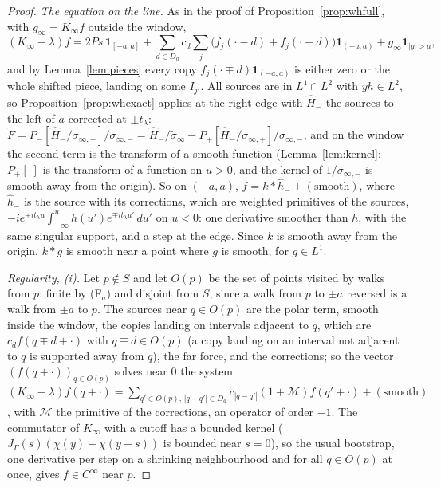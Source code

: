 \documentclass[11pt]{article}
\theoremstyle{definition}
\theoremstyle{remark}
\begin{document}
\begin{proof}
\emph{The equation on the line.} As in the proof of Proposition~\ref{prop:whfull}, with $g_\infty=K_\infty f$ outside the window,
\[
(K_\infty-\lambda)f=2Ps\,\mathbf 1_{[-a,a]}+\sum_{d\in D_a}c_d\sum_j\big(f_j(\cdot-d)+f_j(\cdot+d)\big)\mathbf 1_{(-a,a)}+g_\infty\mathbf 1_{|y|>a},
\]
and by Lemma~\ref{lem:pieces} every copy $f_j(\cdot\mp d)\mathbf 1_{(-a,a)}$ is either zero or the whole shifted piece, landing on some $I_{j'}$. All sources are in $L^1\cap L^2$ with $yh\in L^2$, so Proposition~\ref{prop:whexact} applies at the right edge with $\hat H_-$ the sources to the left of $a$ corrected at $\pm t_\lambda$: $\tilde F=P_-[\hat H_-/\sigma_{\infty,+}]/\sigma_{\infty,-}=\hat H_-/\tilde\sigma_\infty-P_+[\hat H_-/\sigma_{\infty,+}]/\sigma_{\infty,-}$, and on the window the second term is the transform of a smooth function (Lemma~\ref{lem:kernel}: $P_+[\cdot]$ is the transform of a function on $u>0$, and the kernel of $1/\sigma_{\infty,-}$ is smooth away from the origin). So on $(-a,a)$, $f=k*\hat h_-+(\text{smooth})$, where $\hat h_-$ is the source with its corrections, which are weighted primitives of the sources, $-ie^{\pm it_\lambda u}\int_{-\infty}^u h(u')e^{\mp it_\lambda u'}\,du'$ on $u<0$: one derivative smoother than $h$, with the same singular support, and a step at the edge. Since $k$ is smooth away from the origin, $k*g$ is smooth near a point where $g$ is smooth, for $g\in L^1$.

\emph{Regularity, (i).} Let $p\notin S$ and let $O(p)$ be the set of points visited by walks from $p$: finite by (F$_a$) and disjoint from $S$, since a walk from $p$ to $\pm a$ reversed is a walk from $\pm a$ to $p$. The sources near $q\in O(p)$ are the polar term, smooth inside the window, the copies landing on intervals adjacent to $q$, which are $c_d f(q\mp d+\cdot)$ with $q\mp d\in O(p)$ (a copy landing on an interval not adjacent to $q$ is supported away from $q$), the far force, and the corrections; so the vector $(f(q+\cdot))_{q\in O(p)}$ solves near $0$ the system $(K_\infty-\lambda)f(q+\cdot)=\sum_{q'\in O(p),\,|q-q'|\in D_a}c_{|q-q'|}(1+\mathcal M)f(q'+\cdot)+(\text{smooth})$, with $\mathcal M$ the primitive of the corrections, an operator of order $-1$. The commutator of $K_\infty$ with a cutoff has a bounded kernel ($J_\Gamma(s)(\chi(y)-\chi(y-s))$ is bounded near $s=0$), so the usual bootstrap, one derivative per step on a shrinking neighbourhood and for all $q\in O(p)$ at once, gives $f\in C^\infty$ near $p$.


\end{proof}
\end{document}

